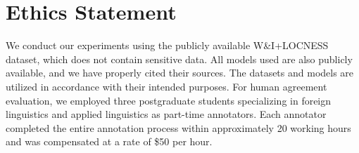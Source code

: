 \section*{Ethics Statement}

We conduct our experiments using the publicly available W\&I+LOCNESS dataset, which does not contain sensitive data. All models used are also publicly available, and we have properly cited their sources. The datasets and models are utilized in accordance with their intended purposes.
For human agreement evaluation, we employed three postgraduate students specializing in foreign linguistics and applied linguistics as part-time annotators. Each annotator completed the entire annotation process within approximately 20 working hours and was compensated at a rate of \$50 per hour.